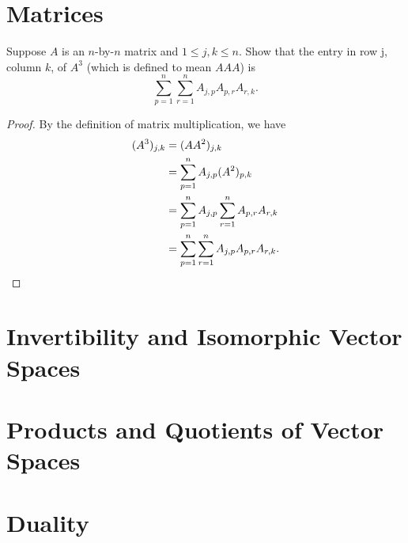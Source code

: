 \section{Matrices}

\begin{exercise}{15}
	Suppose \( A \) is an \( n \)-by-\( n \) matrix and \( 1 \le j, k \le n \). Show that the entry in row j, column \( k \), of \( A^{3} \) (which is defined to mean \( AAA \)) is
	\[
		\sum_{p = 1}^{n} \sum_{r = 1}^{n} A_{j,p}A_{p,r}A_{r,k}.
	\]
\end{exercise}

\begin{proof}
	By the definition of matrix multiplication, we have
	\begin{align*}
		(A^{3})_{j,k} &= (AA^{2})_{j,k} \\
									&= \sum_{p = 1}^{n} A_{j,p}(A^{2})_{p,k} \\
									&= \sum_{p = 1}^{n} A_{j,p} \sum_{r = 1}^{n} A_{p,r}A_{r,k} \\
									&= \sum_{p = 1}^{n} \sum_{r = 1}^{n} A_{j,p}A_{p,r}A_{r,k}. \qedhere
	\end{align*}
\end{proof}

\section{Invertibility and Isomorphic Vector Spaces}

\section{Products and Quotients of Vector Spaces}

\section{Duality}
